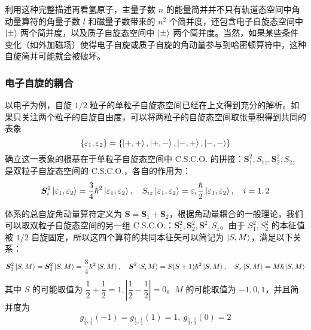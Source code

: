 \documentclass[cn,10pt,math=newtx,citestyle=gb7714-2015,bibstyle=gb7714-2015]{elegantbook}
\def\bm{\boldsymbol}
\def\ve{\varepsilon}
\begin{document}
利用这种完整描述再看氢原子，主量子数 $n$ 的能量简并并不只有轨道态空间中角动量算符的角量子数 $l$ 和磁量子数带来的 $n^2$ 个简并度，还包含电子自旋态空间中 $\ket{\pm}$ 两个简并度，以及质子自旋态空间中 $\ket{\pm}$ 两个简并度。当然，如果某些条件变化（如外加磁场）使得电子自旋或质子自旋的角动量参与到哈密顿算符中，这种自旋简并可能就会被破坏。

\subsubsection{电子自旋的耦合}

以电子为例，自旋 $1/2$ 粒子的单粒子自旋态空间已经在上文得到充分的解析。如果只关注两个粒子的自旋自由度，可以将两粒子的自旋态空间取张量积得到共同的表象
\begin{equation}
    \{\ve_1,\ve_2\} = \{\ket{+,+},\ket{+,-},\ket{-,+},\ket{-,-}\}
\end{equation}
确立这一表象的根基在于单粒子自旋态空间中 C.S.C.O. 的拼接：$\bm S_1^2,S_{1z},\bm S_2^2,S_{2z}$ 是双粒子自旋态空间的 C.S.C.O.，各自的作用为：
\begin{equation}
    \bm S_i^2\ket{\ve_1,\ve_2} = \frac 3 4\hbar^2\ket{\ve_1,\ve_2}, \quad S_{iz}\ket{\ve_1,\ve_2} = \ve_i\frac\hbar 2\ket{\ve_1,\ve_2},\quad i = 1,2
\end{equation}

体系的总自旋角动量算符定义为 $\bm S = \bm S_1+\bm S_2$，根据角动量耦合的一般理论，我们可以取双粒子自旋态空间的另一组 C.S.C.O.：$\bm S_1^2,\bm S_2^2,\bm S^2,S_z$。由于 $S_1^2,S_2^2$ 的本征值被 $1/2$ 自旋固定，所以这四个算符的共同本征矢可以简记为 $\ket{S,M}$，满足以下关系：
\begin{align}
    \bm S_1^2\ket{S,M} =\bm S_2^2\ket{S,M} = \frac 3 4\hbar^2\ket{S,M},\quad \bm S^2\ket{S,M} = S(S+1)\hbar^2\ket{S,M},\quad S_z\ket{S,M} = M\hbar\ket{S,M} 
\end{align}
其中 $S$ 的可能取值为 $\dfrac 1 2 + \dfrac 1 2 =1,\left|\dfrac 1 2 - \dfrac 1 2\right|=0$。$M$ 的可能取值为 $-1,0,1$，并且简并度为
\begin{equation}
    g_{\frac 1 2,\frac 1 2}(-1) = g_{\frac 1 2,\frac 1 2}(1) = 1,\ g_{\frac 1 2,\frac 1 2}(0) = 2
\end{equation}
\end{document}
